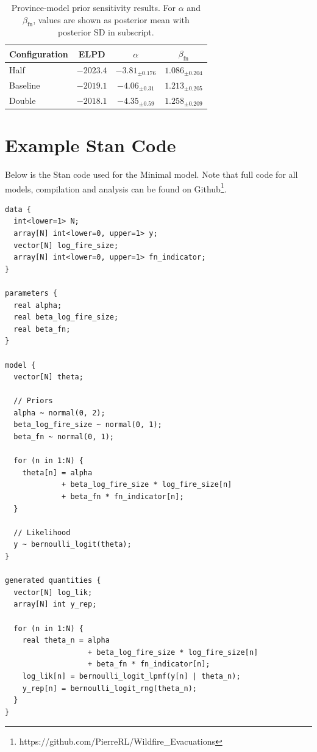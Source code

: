 \begin{table}[h!]
  \centering
  \caption{Province-model prior sensitivity results. For $\alpha$ and $\beta_{\mathrm{fn}}$, values are shown as posterior mean with posterior SD in subscript.}
  \label{tab:sensitivity_appendix_results}
  \begin{tabular}{lccc}
    \hline
    Configuration & ELPD & $\alpha$ & $\beta_{\mathrm{fn}}$ \\
    \hline
    Half & $-2023.4$ & $-3.81_{\pm 0.176}$ & $1.086_{\pm 0.204}$ \\
    Baseline & $-2019.1$ & $-4.06_{\pm 0.31}$ & $1.213_{\pm 0.205}$ \\
    Double & $-2018.1$ & $-4.35_{\pm 0.59}$ & $1.258_{\pm 0.209}$ \\
    \hline
  \end{tabular}
\end{table}

\section{Example Stan Code}\label{sec:stan_code}

Below is the Stan code used for the Minimal model. Note that full code for all models, compilation and analysis can be found on Github\footnote{https://github.com/PierreRL/Wildfire\_Evacuations}.
\begin{verbatim}
data {
  int<lower=1> N;
  array[N] int<lower=0, upper=1> y;
  vector[N] log_fire_size;
  array[N] int<lower=0, upper=1> fn_indicator;
}

parameters {
  real alpha;
  real beta_log_fire_size;
  real beta_fn;
}

model {
  vector[N] theta;

  // Priors
  alpha ~ normal(0, 2);
  beta_log_fire_size ~ normal(0, 1);
  beta_fn ~ normal(0, 1);

  for (n in 1:N) {
    theta[n] = alpha
             + beta_log_fire_size * log_fire_size[n]
             + beta_fn * fn_indicator[n];
  }

  // Likelihood
  y ~ bernoulli_logit(theta);
}

generated quantities {
  vector[N] log_lik;
  array[N] int y_rep;

  for (n in 1:N) {
    real theta_n = alpha
                   + beta_log_fire_size * log_fire_size[n]
                   + beta_fn * fn_indicator[n];
    log_lik[n] = bernoulli_logit_lpmf(y[n] | theta_n);
    y_rep[n] = bernoulli_logit_rng(theta_n);
  }
}
\end{verbatim}

